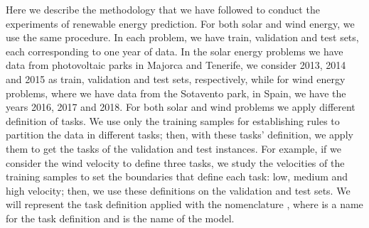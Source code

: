 %
\begin{table}[t!]
    \caption{Hyperparameters, grids used to find them (when appropriate), and hyperparameter selection method for each model. Here, $d$ is the number of {dimensions} %
     of the data and $\sigma$ is the standard deviation of the~target.}
    \label{tab:hyperpars_grid_energies}
    \centering
\end{table}

Here we describe the methodology that we have followed to conduct the experiments of renewable energy prediction.
%
For both solar and wind energy, we use the same procedure. In each problem, we have train, validation and test sets, each corresponding to one year of data. In the solar energy problems we have data from photovoltaic parks in Majorca and Tenerife, we consider 2013, 2014 and 2015 as train, validation and test sets, respectively, while for wind energy problems, where we have data from the Sotavento park, in Spain, we have the years 2016, 2017 and 2018.
%
For both solar and wind problems we apply different definition of tasks. We use only the training samples for establishing rules to partition the data in different tasks; then, with these tasks' definition, we apply them to get the tasks of the validation and test instances.
%
For example, if we consider the wind velocity to define three tasks, we study the velocities of the training samples to set the boundaries that define each task: low, medium and high velocity; then, we use these definitions on the validation and test sets.
%
We will represent the task definition applied with the nomenclature , where  is a name for the task definition and  is the name of the model.

